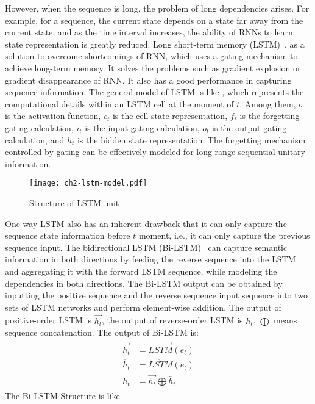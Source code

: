 However, when the sequence is long, the problem of long dependencies arises. For example, for a sequence, the current state depends on a state far away from the current state, and as the time interval increases, the ability of RNNs to learn state representation is greatly reduced. Long short-term memory (LSTM)~\cite{lstm1997, lindemann2020survey}, as a solution to overcome shortcomings of RNN, which uses a gating mechanism to achieve long-term memory. It solves the problems such as gradient explosion or gradient disappearance of RNN. It also has a good performance in capturing sequence information. The general model of LSTM is like \figname{\ref{fig:ch2-lstm-model}}, which represents the computational details within an LSTM cell at the moment of \(t\). Among them, \(\sigma\) is the activation function, \(c_t\) is the cell state representation, \(f_t\) is the forgetting gating calculation, \(i_t\) is the input gating calculation, \(o_t\) is the output gating calculation, and \(h_t\) is the hidden state representation. The forgetting mechanism controlled by gating can be effectively modeled for long-range sequential unitary information.

\begin{figure}[htbp!]
    \centering
    \texttt{[image: ch2-lstm-model.pdf]}
    \caption{Structure of LSTM unit}\label{fig:ch2-lstm-model}
\end{figure}

One-way LSTM also has an inherent drawback that it can only capture the sequence state information before \(t\) moment, i.e., it can only capture the previous sequence input. The bidirectional LSTM (Bi-LSTM)~\cite{graves2005framewise} can capture semantic information in both directions by feeding the reverse sequence into the LSTM and aggregating it with the forward LSTM sequence, while modeling the dependencies in both directions. The Bi-LSTM output can be obtained by inputting the positive sequence and the reverse sequence input sequence into two sets of LSTM networks and perform element-wise addition. The output of positive-order LSTM is \(\overrightarrow{h_t}\), the output of reverse-order LSTM is \(\overleftarrow{h_t}\), \(\bigoplus \) means sequence concatenation. The output of Bi-LSTM is:
\begin{align}
    \begin{split}
        \overrightarrow{h_t} & = \overrightarrow{LSTM}(e_t)                       \\
        \overleftarrow{h_t}  & = \overleftarrow{LSTM}(e_t)                        \\
        h_t                  & =\overrightarrow{h_t}\bigoplus \overleftarrow{h_t}
    \end{split}
\end{align}
The Bi-LSTM Structure is like \figname{\ref{fig:ch2-model-bilstm}}.

